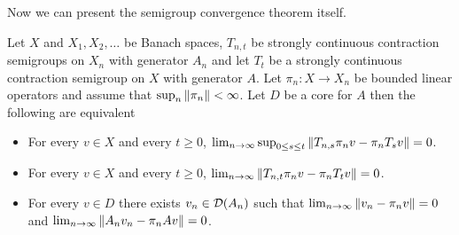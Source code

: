 Now we can present the semigroup convergence theorem itself.

\begin{thm}\label{KurtzSovaSemigroupConvergence}Let $X$ and $X_1, X_2, \dotsc$ be Banach spaces, $T_{n,t}$ be strongly continuous contraction semigroups on $X_n$ with generator $A_n$ and let $T_t$ be a strongly continuous contraction semigroup on $X$ with generator $A$.  Let $\pi_n : X \to X_n$ be bounded linear operators and assume that $\sup_{n} \left \lVert \pi_n \right \rVert < \infty$.  Let $D$ be a
core for $A$ then the following are equivalent
\begin{itemize}
\item[(i)]For every $v \in X$ and every $t \geq 0$,  $\lim_{n \to \infty} \sup_{0 \leq s \leq t} \left \lVert T_{n,s} \pi_n v - \pi_n T_s v \right \rVert = 0$.
\item[(ii)]For every $v \in X$ and every $t \geq 0$,  $\lim_{n \to \infty} \left \lVert T_{n,t} \pi_n v - \pi_n T_t v \right \rVert = 0$.
\item[(iii)] For every $v \in D$ there exists $v_n \in \mathcal{D}(A_n)$ such that $\lim_{n \to \infty} \left \lVert v_n - \pi_n v \right \rVert = 0$ and $\lim_{n \to \infty} \left \lVert A_n v_n - \pi_n A v \right \rVert = 0$.
\end{itemize}
\end{thm}
